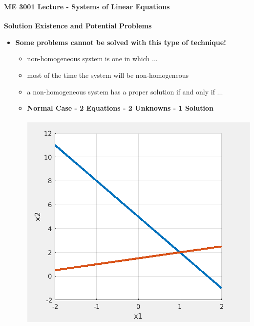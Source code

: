 \documentclass[11pt]{article}
\newcommand{\B}{\color{blue}}
\newcommand{\PR}{\color{mypurple}}
\begin{document}
\textbf{ \LARGE ME 3001 Lecture - Systems of Linear Equations} \\\\
\textbf{ \LARGE Solution Existence and Potential Problems } \\


 \renewcommand\labelitemi{\textbullet}
 \renewcommand\labelitemii{\textendash}
 \renewcommand\labelitemiii{\textasteriskcentered}
 \renewcommand\labelitemiv{\textperiodcentered}

\Large
\begin{itemize}

\Large
\item \textbf{ Some problems cannot be solved with this type of technique!} \\	
\begin{itemize}
\item {\PR non-homogeneous} system is one in which ... \vspace{10mm}\\
\item most of the time the system will be {\PR non-homogeneous} \vspace{10mm}\\
\item a {\PR non-homogeneous} system has a {\B proper solution} if and only if ...\vspace{10mm}\\
	

\newpage
\item {\bf Normal Case - 2 Equations - 2 Unknowns - 1 Solution} \\\\ \includegraphics[scale=1]{lecture5_fig1.png} \\\\
\\\\


\end{itemize}
\end{itemize}
\end{document}
